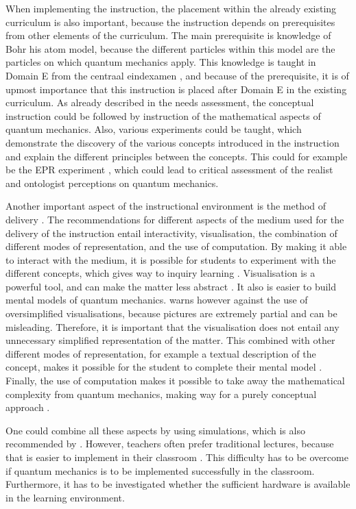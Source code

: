 \documentclass[11pt,twoside]{report} %
\begin{document}
When implementing the instruction, the placement within the already existing curriculum is also important, because the instruction depends on prerequisites from other elements of the curriculum. The main prerequisite is knowledge of Bohr his atom model, because the different particles within this model are the particles on which quantum mechanics apply. This knowledge is taught in Domain E from the centraal eindexamen \cite{eindexamen2016}, and because of the prerequisite, it is of upmost importance that this instruction is placed after Domain E in the existing curriculum. As already described in the needs assessment, the conceptual instruction could be followed by instruction of the mathematical aspects of quantum mechanics. Also, various experiments could be taught, which demonstrate the discovery of the various concepts introduced in the instruction and explain the different principles between the concepts. This could for example be the EPR experiment \cite{kuttner, muller, velentzas}, which could lead to critical assessment of the realist and ontologist perceptions on quantum mechanics.

Another important aspect of the instructional environment is the method of delivery \cite{smithragan}. The recommendations for different aspects of the medium used for the delivery of the instruction entail interactivity, visualisation, the combination of different modes of representation, and the use of computation. By making it able to interact with the medium, it is possible for students to experiment with the different concepts, which gives way to inquiry learning \cite{adegoke, asikainen, dori, mckagan}. Visualisation is a powerful tool, and can make the matter less abstract \cite{dori, henriksen, mckagan}. It also is easier to build mental models of quantum mechanics.  warns however against the use of oversimplified visualisations, because pictures are extremely partial and can be misleading. Therefore, it is important that the visualisation does not entail any unnecessary simplified representation of the matter. This combined with other different modes of representation, for example a textual description of the concept, makes it possible for the student to complete their mental model \cite{dori}. Finally, the use of computation makes it possible to take away the mathematical complexity from quantum mechanics, making way for a purely conceptual approach \cite{barnes, mckagan, velentzas}.

One could combine all these aspects by using simulations, which is also recommended by . However, teachers often prefer traditional lectures, because that is easier to implement in their classroom \cite{adegoke}. This difficulty has to be overcome if quantum mechanics is to be implemented successfully in the classroom. Furthermore, it has to be investigated whether the sufficient hardware is available in the learning environment.
\end{document}
